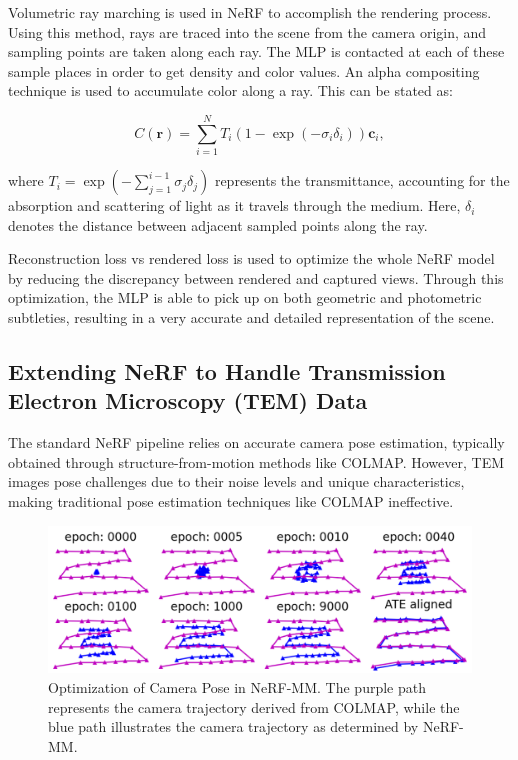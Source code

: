 Volumetric ray marching is used in NeRF\cite{Mildenhall2020} to accomplish the rendering process. Using this method, rays are traced into the scene from the camera origin, and sampling points are taken along each ray. The MLP is contacted at each of these sample places in order to get density and color values. An alpha compositing technique is used to accumulate color along a ray. This can be stated as:


$$C(\mathbf{r}) = \sum_{i=1}^{N} T_i (1 - \exp(-\sigma_i \delta_i)) \mathbf{c}_i,$$

where $T_i = \exp(- \sum_{j=1}^{i-1} \sigma_j \delta_j)$ represents\cite{Mildenhall2020} the transmittance, accounting for the absorption and scattering of light as it travels through the medium. Here, $\delta_i$ denotes the distance between adjacent sampled points along the ray.

\vspace{10pt}
Reconstruction loss vs rendered loss is used to optimize the whole NeRF model by reducing the discrepancy between rendered and captured views. Through this optimization, the MLP is able to pick up on both geometric and photometric subtleties, resulting in a very accurate and detailed representation of the scene.


\subsection{Extending NeRF to Handle Transmission Electron Microscopy (TEM) Data}
The standard NeRF pipeline relies on accurate camera pose estimation, typically obtained through structure-from-motion methods like COLMAP. However, TEM images pose challenges due to their noise levels and unique characteristics, making traditional pose estimation techniques like COLMAP ineffective.

\vspace{10pt}
\begin{figure}[thbp]
    \centering
    \includegraphics[width=.9\textwidth]{img/Colmap_nerfMM.png}
    \caption{Optimization of Camera Pose in NeRF-MM. The purple path represents the camera trajectory derived from COLMAP, while the blue path illustrates the camera trajectory as determined by NeRF-MM. \cite{Wang2021}
}\label{fig: Camera pose comparison NerfMM}
\end{figure}

